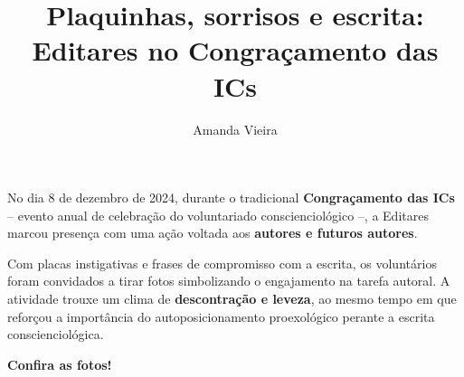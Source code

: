 \documentclass{gescons}
\author{Amanda Vieira}
\title{Plaquinhas, sorrisos e escrita: Editares no Congraçamento das ICs}
\begin{document}
    \makeentrevistatitle


    






No dia 8 de dezembro de 2024, durante o tradicional \textbf{Congraçamento das ICs} -- evento anual de celebração do voluntariado conscienciológico --, a Editares marcou presença com uma ação voltada aos \textbf{autores e futuros autores}.

Com placas instigativas e frases de compromisso com a escrita, os voluntários foram convidados a tirar fotos simbolizando o engajamento na tarefa autoral. A atividade trouxe um clima de \textbf{descontração e leveza}, ao mesmo tempo em que reforçou a importância do autoposicionamento proexológico perante a escrita conscienciológica.

\textbf{Confira as fotos!}
\end{document}
